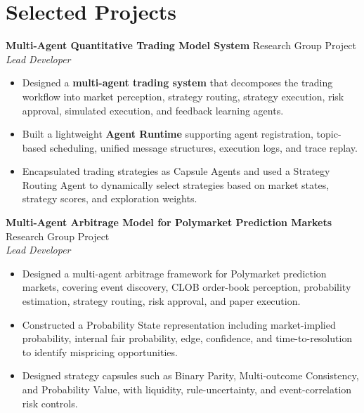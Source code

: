 \documentclass{resume}
\begin{document}
\section{\textbf{Selected Projects}}

\noindent
\textbf{Multi-Agent Quantitative Trading Model System} \hfill Research Group Project \\
\textit{Lead Developer}
\begin{itemize}
  \item Designed a \textbf{multi-agent trading system} that decomposes the trading workflow into market perception, strategy routing, strategy execution, risk approval, simulated execution, and feedback learning agents.
  \item Built a lightweight \textbf{Agent Runtime} supporting agent registration, topic-based scheduling, unified message structures, execution logs, and trace replay.
  \item Encapsulated trading strategies as Capsule Agents and used a Strategy Routing Agent to dynamically select strategies based on market states, strategy scores, and exploration weights.
\end{itemize}

\noindent
\textbf{Multi-Agent Arbitrage Model for Polymarket Prediction Markets} \hfill Research Group Project \\
\textit{Lead Developer}
\begin{itemize}
  \item Designed a multi-agent arbitrage framework for Polymarket prediction markets, covering event discovery, CLOB order-book perception, probability estimation, strategy routing, risk approval, and paper execution.
  \item Constructed a Probability State representation including market-implied probability, internal fair probability, edge, confidence, and time-to-resolution to identify mispricing opportunities.
  \item Designed strategy capsules such as Binary Parity, Multi-outcome Consistency, and Probability Value, with liquidity, rule-uncertainty, and event-correlation risk controls.
\end{itemize}
\end{document}
